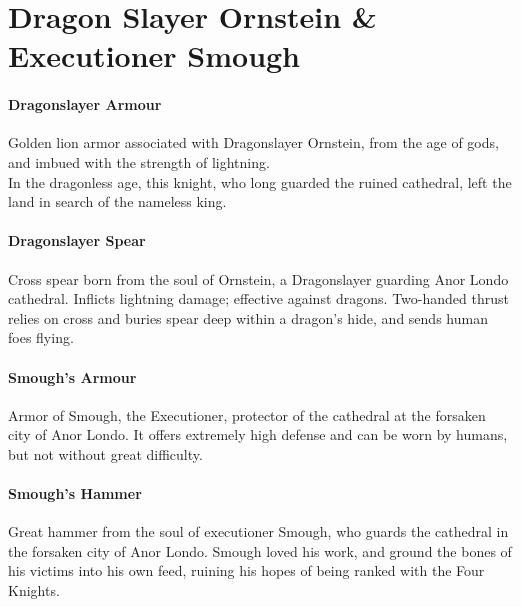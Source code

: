 \documentclass[twocolumn,a4paper]{article}
\begin{document}
\section*{Dragon Slayer Ornstein \& Executioner Smough}
\paragraph{Dragonslayer Armour}
Golden lion armor associated with Dragonslayer Ornstein, from the age of gods, and imbued with the strength of lightning.\\
In the dragonless age, this knight, who long guarded the ruined cathedral, left the land in search of the nameless king.
\paragraph{Dragonslayer Spear}
Cross spear born from the soul of Ornstein, a Dragonslayer guarding Anor Londo cathedral. Inflicts lightning damage; effective against dragons. Two-handed thrust relies on cross and buries spear deep within a dragon's hide, and sends human foes flying.
\paragraph{Smough's Armour}
Armor of Smough, the Executioner, protector of the cathedral at the forsaken city of Anor Londo. It offers extremely high defense and can be worn by humans, but not without great difficulty.
\paragraph{Smough's Hammer}
Great hammer from the soul of executioner Smough, who guards the cathedral in the forsaken city of Anor Londo. Smough loved his work, and ground the bones of his victims into his own feed, ruining his hopes of being ranked with the Four Knights.
\end{document}
